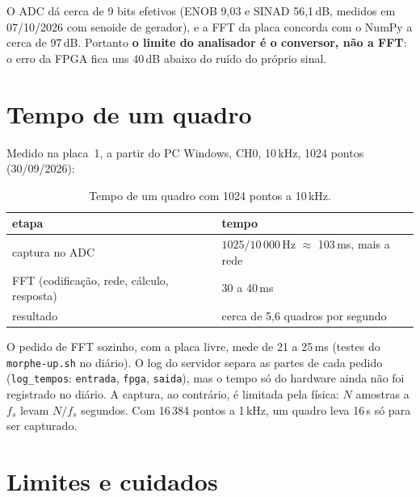 \documentclass[11pt,a4paper,oneside]{article}
\begin{document}
O ADC dá cerca de 9 bits efetivos (ENOB 9,03 e SINAD 56,1\,dB, medidos em
07/10/2026 com senoide de gerador), e a FFT da placa concorda com o NumPy a
cerca de 97\,dB. Portanto \textbf{o limite do analisador é o conversor, não a
FFT}: o erro da FPGA fica uns 40\,dB abaixo do ruído do próprio sinal.

\section{Tempo de um quadro}

Medido na placa~1, a partir do PC Windows, CH0, 10\,kHz, 1024 pontos
(30/09/2026):

\begin{table}[H]
\centering
\small
\begin{tabular}{@{}l l@{}}
\toprule
etapa & tempo \\
\midrule
captura no ADC & $1025 / 10\,000$\,Hz $\approx$ 103\,ms, mais a rede \\
FFT (codificação, rede, cálculo, resposta) & 30 a 40\,ms \\
resultado & cerca de 5,6 quadros por segundo \\
\bottomrule
\end{tabular}
\caption{Tempo de um quadro com 1024 pontos a 10\,kHz.}
\end{table}

O pedido de FFT sozinho, com a placa livre, mede de 21 a 25\,ms (testes do
\texttt{morphe-up.sh} no diário). O log do servidor separa as partes de cada
pedido (\texttt{log\_tempos}: \texttt{entrada}, \texttt{fpga},
\texttt{saida}), mas o tempo só do hardware ainda não foi registrado no
diário. A captura, ao contrário, é limitada pela física: $N$ amostras a $f_s$
levam $N/f_s$ segundos. Com 16\,384 pontos a 1\,kHz, um quadro leva 16\,s só
para ser capturado.

\section{Limites e cuidados}
\end{document}
